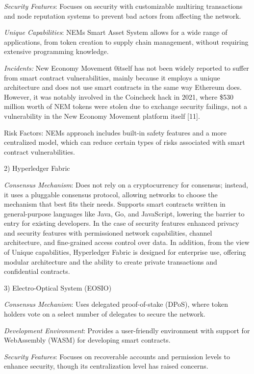 \emph{Security Features}: Focuses on security with customizable
multiring transactions and node reputation systems to prevent bad actors
from affecting the network.

\emph{Unique Capabilities}: NEM\textquotesingle s Smart Asset System
allows for a wide range of applications, from token creation to supply
chain management, without requiring extensive programming knowledge.

\emph{Incidents:} New Economy Movement 0itself has not been widely
reported to suffer from smart contract vulnerabilities, mainly because
it employs a unique architecture and does not use smart contracts in the
same way Ethereum does. However, it was notably involved in the
Coincheck hack in 2021, where \$530 million worth of NEM tokens were
stolen due to exchange security failings, not a vulnerability in the New
Economy Movement platform itself {[}11{]}.

Risk Factors: NEM\textquotesingle s approach includes built-in safety
features and a more centralized model, which can reduce certain types of
risks associated with smart contract vulnerabilities.

2) Hyperledger Fabric

\emph{Consensus Mechanism}: Does not rely on a cryptocurrency for
consensus; instead, it uses a pluggable consensus protocol, allowing
networks to choose the mechanism that best fits their needs. Supports
smart contracts written in general-purpose languages like Java, Go, and
JavaScript, lowering the barrier to entry for existing developers. In
the case of security features enhanced privacy and security features
with permissioned network capabilities, channel architecture, and
fine-grained access control over data. In addition, from the view of
Unique capabilities, Hyperledger Fabric is designed for enterprise use,
offering modular architecture and the ability to create private
transactions and confidential contracts.

3) Electro-Optical System (EOSIO)

\emph{Consensus Mechanism}: Uses delegated proof-of-stake (DPoS), where
token holders vote on a select number of delegates to secure the
network.

\emph{Development Environment}: Provides a user-friendly environment
with support for WebAssembly (WASM) for developing smart contracts.

\emph{Security Features}: Focuses on recoverable accounts and permission
levels to enhance security, though its centralization level has raised
concerns.

